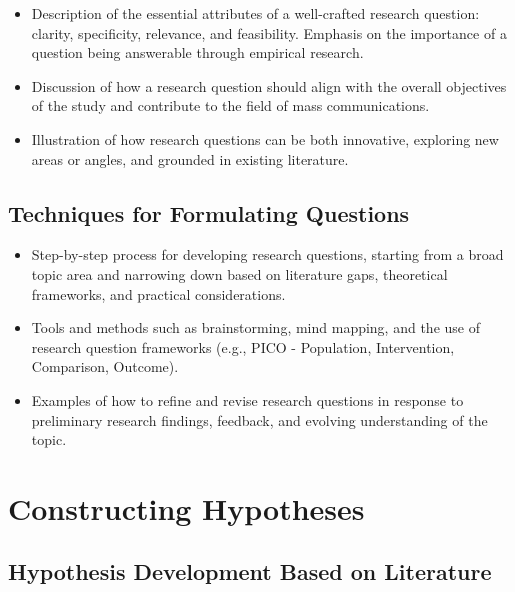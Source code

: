 \documentclass[
]{book}
\begin{document}
\begin{itemize}
\item
  Description of the essential attributes of a well-crafted research question: clarity, specificity, relevance, and feasibility. Emphasis on the importance of a question being answerable through empirical research.
\item
  Discussion of how a research question should align with the overall objectives of the study and contribute to the field of mass communications.
\item
  Illustration of how research questions can be both innovative, exploring new areas or angles, and grounded in existing literature.
\end{itemize}

\hypertarget{techniques-for-formulating-questions}{%
\subsection*{Techniques for Formulating Questions}\label{techniques-for-formulating-questions}}

\begin{itemize}
\item
  Step-by-step process for developing research questions, starting from a broad topic area and narrowing down based on literature gaps, theoretical frameworks, and practical considerations.
\item
  Tools and methods such as brainstorming, mind mapping, and the use of research question frameworks (e.g., PICO - Population, Intervention, Comparison, Outcome).
\item
  Examples of how to refine and revise research questions in response to preliminary research findings, feedback, and evolving understanding of the topic.
\end{itemize}

\hypertarget{constructing-hypotheses}{%
\section*{Constructing Hypotheses}\label{constructing-hypotheses}}

\hypertarget{hypothesis-development-based-on-literature}{%
\subsection*{Hypothesis Development Based on Literature}\label{hypothesis-development-based-on-literature}}
\end{document}
